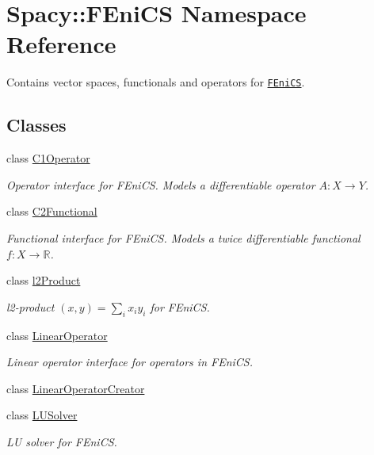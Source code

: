 \hypertarget{namespaceSpacy_1_1FEniCS}{}\section{Spacy\+:\+:F\+Eni\+CS Namespace Reference}
\label{namespaceSpacy_1_1FEniCS}


Contains vector spaces, functionals and operators for \href{www.fenicsproject.org}{\tt F\+Eni\+CS}.  


\subsection*{Classes}
\begin{DoxyCompactItemize}
\item 
class \hyperlink{classSpacy_1_1FEniCS_1_1C1Operator}{C1\+Operator}
\begin{DoxyCompactList}\small\item\em Operator interface for F\+Eni\+CS. Models a differentiable operator $A:X\rightarrow Y$. \end{DoxyCompactList}\item 
class \hyperlink{classSpacy_1_1FEniCS_1_1C2Functional}{C2\+Functional}
\begin{DoxyCompactList}\small\item\em Functional interface for F\+Eni\+CS. Models a twice differentiable functional $f:X\rightarrow \mathbb{R}$. \end{DoxyCompactList}\item 
class \hyperlink{classSpacy_1_1FEniCS_1_1l2Product}{l2\+Product}
\begin{DoxyCompactList}\small\item\em l2-\/product $(x,y) = \sum_i x_i y_i $ for F\+Eni\+CS. \end{DoxyCompactList}\item 
class \hyperlink{classSpacy_1_1FEniCS_1_1LinearOperator}{Linear\+Operator}
\begin{DoxyCompactList}\small\item\em Linear operator interface for operators in F\+Eni\+CS. \end{DoxyCompactList}\item 
class \hyperlink{classSpacy_1_1FEniCS_1_1LinearOperatorCreator}{Linear\+Operator\+Creator}
\item 
class \hyperlink{classSpacy_1_1FEniCS_1_1LUSolver}{L\+U\+Solver}
\begin{DoxyCompactList}\small\item\em LU solver for F\+Eni\+CS. \end{DoxyCompactList}\item 

\end{DoxyCompactItemize}
